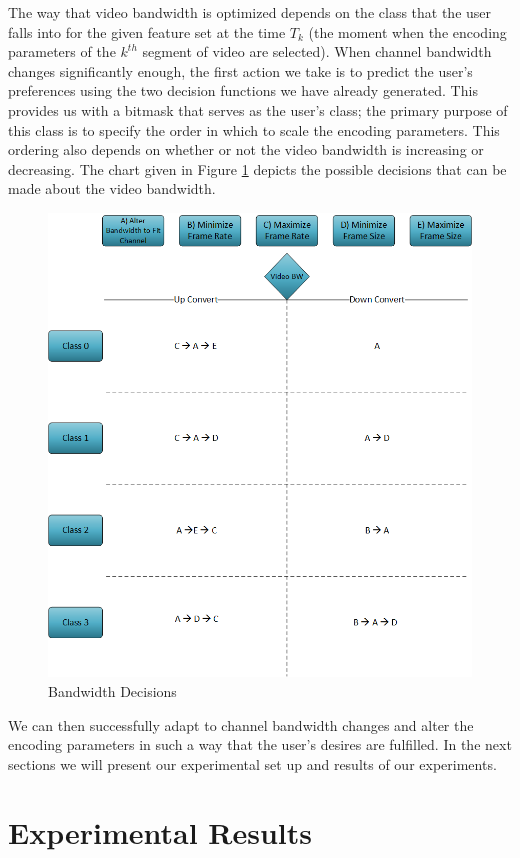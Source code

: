 \documentclass[a4paper,12pt]{article}
\begin{document}
The way that video bandwidth is optimized depends on the class that the user falls into for the given feature set at the time $T_k$ (the moment when the encoding parameters of the $k^{th}$ segment of video are selected). When channel bandwidth changes significantly enough, the first action we take is to predict the user’s preferences using the two decision functions we have already generated. This provides us with a bitmask that serves as the user’s class; the primary purpose of this class is to specify the order in which to scale the encoding parameters. This ordering also depends on whether or not the video bandwidth is increasing or decreasing. The chart given in Figure \ref{fig:ScalingDecisionChart} depicts the possible decisions that can be made about the video bandwidth.
\begin{figure}[h]
\centering
\includegraphics[width=0.7\linewidth]{BandwidthDecisions.png}
\caption{Bandwidth Decisions}
\label{fig:ScalingDecisionChart}
\end{figure}
We can then successfully adapt to channel bandwidth changes and alter the encoding parameters in such a way that the user’s desires are fulfilled. In the next sections we will present our experimental set up and results of our experiments.

\section{Experimental Results}
\label{sec:Results}
\end{document}
